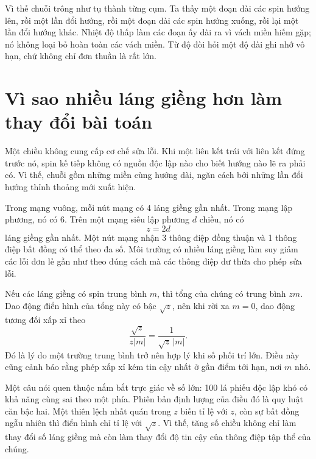 Vì thế chuỗi trông như tụ thành từng cụm. Ta thấy một đoạn dài các spin hướng lên, rồi một lần đổi hướng, rồi một đoạn dài các spin hướng xuống, rồi lại một lần đổi hướng khác. Nhiệt độ thấp làm các đoạn ấy dài ra vì vách miền hiếm gặp; nó không loại bỏ hoàn toàn các vách miền. Từ độ đòi hỏi một độ dài ghi nhớ vô hạn, chứ không chỉ đơn thuần là rất lớn.

\section{Vì sao nhiều láng giềng hơn làm thay đổi bài toán}

Một chiều không cung cấp cơ chế sửa lỗi. Khi một liên kết trái với liên kết đứng trước nó, spin kế tiếp không có nguồn độc lập nào cho biết hướng nào lẽ ra phải có. Vì thế, chuỗi gồm những miền cùng hướng dài, ngăn cách bởi những lần đổi hướng thỉnh thoảng mới xuất hiện.

Trong mạng vuông, mỗi nút mạng có 4 láng giềng gần nhất. Trong mạng lập phương, nó có 6. Trên một mạng siêu lập phương \(d\) chiều, nó có
\begin{equation}
z=2d
\end{equation}
láng giềng gần nhất. Một nút mạng nhận 3 thông điệp đồng thuận và 1 thông điệp bất đồng có thể theo đa số. Môi trường có nhiều láng giềng làm suy giảm các lỗi đơn lẻ gần như theo đúng cách mà các thông điệp dư thừa cho phép sửa lỗi.

Nếu các láng giềng có spin trung bình \(m\), thì tổng của chúng có trung bình \(zm\). Dao động điển hình của tổng này có bậc \(\sqrt{z}\), nên khi rời xa \(m=0\), dao động tương đối xấp xỉ theo
\begin{equation}
\frac{\sqrt{z}}{z|m|}
=\frac{1}{\sqrt{z}\,|m|}.
\end{equation}
Đó là lý do một trường trung bình trở nên hợp lý khi số phối trí lớn. Điều này cũng cảnh báo rằng phép xấp xỉ kém tin cậy nhất ở gần điểm tới hạn, nơi \(m\) nhỏ.

Một câu nói quen thuộc nắm bắt trực giác về số lớn: 100 lá phiếu độc lập khó có khả năng cùng sai theo một phía. Phiên bản định lượng của điều đó là quy luật căn bậc hai. Một thiên lệch nhất quán trong \(z\) biến tỉ lệ với \(z\), còn sự bất đồng ngẫu nhiên thì điển hình chỉ tỉ lệ với \(\sqrt{z}\). Vì thế, tăng số chiều không chỉ làm thay đổi số láng giềng mà còn làm thay đổi độ tin cậy của thông điệp tập thể của chúng.

\begin{classroomqa}
\end{classroomqa}

